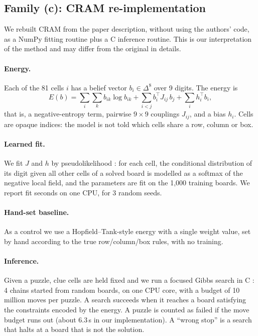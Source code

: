 \documentclass{article} %
\begin{document}
\subsection{Family (c): CRAM re-implementation}
We rebuilt CRAM from the paper description, without using the authors' code, as a NumPy fitting routine plus a C inference routine. This is our interpretation of the method and may differ from the original in details.

\paragraph{Energy.}
Each of the 81 cells $i$ has a belief vector $b_i \in \Delta^{8}$ over 9 digits. The energy is
\begin{equation}
E(b) = \sum_{i}\sum_{k} b_{ik}\log b_{ik} + \sum_{i<j} b_i^{\top} J_{ij}\, b_j + \sum_i h_i^{\top} b_i,
\end{equation}
that is, a negative-entropy term, pairwise $9\times 9$ couplings $J_{ij}$, and a bias $h_i$. Cells are opaque indices: the model is not told which cells share a row, column or box.

\paragraph{Learned fit.}
We fit $J$ and $h$ by pseudolikelihood \citep{besag1975}: for each cell, the conditional distribution of its digit given all other cells of a solved board is modelled as a softmax of the negative local field, and the parameters are fit on the 1{,}000 training boards. We report fit seconds on one CPU, for 3 random seeds.

\paragraph{Hand-set baseline.}
As a control we use a Hopfield--Tank-style energy with a single weight value, set by hand according to the true row/column/box rules, with no training.

\paragraph{Inference.}
Given a puzzle, clue cells are held fixed and we run a focused Gibbs search in C \citep{geman1984,selman1994noise}: 4 chains started from random boards, on one CPU core, with a budget of 10 million moves per puzzle. A search succeeds when it reaches a board satisfying the constraints encoded by the energy. A puzzle is counted as failed if the move budget runs out (about 6.3\,s in our implementation). A ``wrong stop'' is a search that halts at a board that is not the solution.
\end{document}
